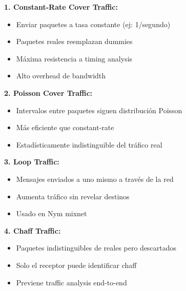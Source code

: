 \documentclass[11pt,a4paper,twoside]{book}
\theoremstyle{definition}
\theoremstyle{remark}
\begin{document}
\begin{mathnote}
\textbf{1. Constant-Rate Cover Traffic:}
\begin{itemize}
    \item Enviar paquetes a tasa constante (ej: 1/segundo)
    \item Paquetes reales reemplazan dummies
    \item Máxima resistencia a timing analysis
    \item Alto overhead de bandwidth
\end{itemize}

\textbf{2. Poisson Cover Traffic:}
\begin{itemize}
    \item Intervalos entre paquetes siguen distribución Poisson
    \item Más eficiente que constant-rate
    \item Estadísticamente indistinguible del tráfico real
\end{itemize}

\textbf{3. Loop Traffic:}
\begin{itemize}
    \item Mensajes enviados a uno mismo a través de la red
    \item Aumenta tráfico sin revelar destinos
    \item Usado en Nym mixnet
\end{itemize}

\textbf{4. Chaff Traffic:}
\begin{itemize}
    \item Paquetes indistinguibles de reales pero descartados
    \item Solo el receptor puede identificar chaff
    \item Previene traffic analysis end-to-end
\end{itemize}
\end{mathnote}
\end{document}
